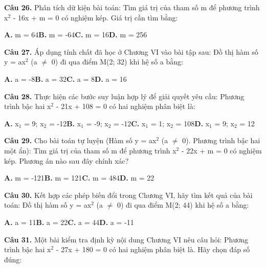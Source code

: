 \documentclass[11pt,a4paper]{article}
\begin{document}
\textbf{\color{primary} Câu 26.} Phân tích dữ kiện bài toán: Tìm giá trị của tham số m để phương trình x$^2$ - 16x + m = 0 có nghiệm kép. Giá trị cần tìm bằng:\par
\hspace*{1.5em}\textbf{A.} m = 64\quad\quad \textbf{B.} m = -64\quad\quad \textbf{C.} m = 16\quad\quad \textbf{D.} m = 256\par\vspace{2pt}
\textbf{\color{primary} Câu 27.} Áp dụng tính chất đã học ở Chương VI vào bài tập sau: Đồ thị hàm số y = ax$^2$ (a $\ne$ 0) đi qua điểm M(2; 32) khi hệ số a bằng:\par
\hspace*{1.5em}\textbf{A.} a = -8\quad\quad \textbf{B.} a = 32\quad\quad \textbf{C.} a = 8\quad\quad \textbf{D.} a = 16\par\vspace{2pt}
\textbf{\color{primary} Câu 28.} Thực hiện các bước suy luận hợp lý để giải quyết yêu cầu: Phương trình bậc hai x$^2$ - 21x + 108 = 0 có hai nghiệm phân biệt là:\par
\hspace*{1.5em}\textbf{A.} x$_1$ = 9; x$_2$ = -12\quad\quad \textbf{B.} x$_1$ = -9; x$_2$ = -12\quad\quad \textbf{C.} x$_1$ = 1; x$_2$ = 108\quad\quad \textbf{D.} x$_1$ = 9; x$_2$ = 12\par\vspace{2pt}
\textbf{\color{primary} Câu 29.} Cho bài toán tự luyện (Hàm số y = ax$^2$ (a $\ne$ 0). Phương trình bậc hai một ẩn): Tìm giá trị của tham số m để phương trình x$^2$ - 22x + m = 0 có nghiệm kép. Phương án nào sau đây chính xác?\par
\hspace*{1.5em}\textbf{A.} m = -121\quad\quad \textbf{B.} m = 121\quad\quad \textbf{C.} m = 484\quad\quad \textbf{D.} m = 22\par\vspace{2pt}
\textbf{\color{primary} Câu 30.} Kết hợp các phép biến đổi trong Chương VI, hãy tìm kết quả của bài toán: Đồ thị hàm số y = ax$^2$ (a $\ne$ 0) đi qua điểm M(2; 44) khi hệ số a bằng:\par
\hspace*{1.5em}\textbf{A.} a = 11\quad\quad \textbf{B.} a = 22\quad\quad \textbf{C.} a = 44\quad\quad \textbf{D.} a = -11\par\vspace{2pt}
\textbf{\color{primary} Câu 31.} Một bài kiểm tra định kỳ nội dung Chương VI nêu câu hỏi: Phương trình bậc hai x$^2$ - 27x + 180 = 0 có hai nghiệm phân biệt là. Hãy chọn đáp số đúng:\par
\end{document}
